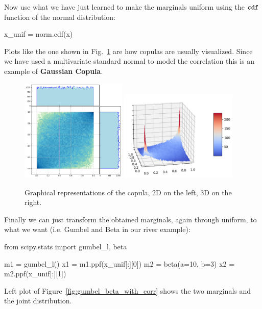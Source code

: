 Now use what we have just learned to make the marginals uniform using the \(\tt{cdf}\) function of the normal distribution:

\begin{ipython}
x_unif = norm.cdf(x)
\end{ipython}

Plots like the one shown in Fig.~\ref{fig:copula} are how copulas are usually visualized. Since we have used a multivariate standard normal to model the correlation this is an example of \textbf{Gaussian Copula}.

\begin{figure}[htb]
\centering
\includegraphics[width=0.45\textwidth]{figures/copula_2d}
\quad
\includegraphics[width=0.5\textwidth]{figures/copula_3d}
\caption{Graphical representations of the copula, 2D on the left, 3D on the right.}
\label{fig:copula}
\end{figure}

Finally we can just transform the obtained marginals, again through uniform, to what we want (i.e. Gumbel and Beta in our river example):

\begin{ipython}
from scipy.stats import gumbel_l, beta

m1 = gumbel_l()
x1 = m1.ppf(x_unif[:][0])
m2 = beta(a=10, b=3)
x2 = m2.ppf(x_unif[:][1])
\end{ipython}

Left plot of Figure~\ref{fig:gumbel_beta_with_corr} shows the two marginals and the joint distribution.
    

